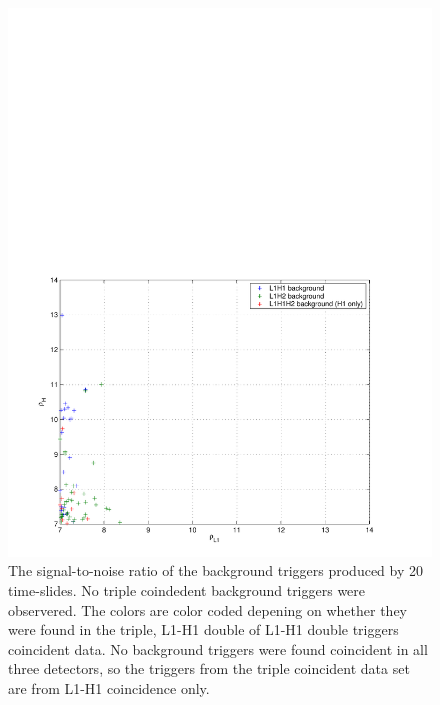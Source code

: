 \begin{figure}[p]
\begin{center}
\includegraphics[width=\textwidth]{figures/result/bkg}
\end{center}
\caption[Background Triggers from 20 Time Slides]{%
\label{f:bkg}%
The signal-to-noise ratio of the background triggers produced by 20
time-slides. No triple coindedent background triggers were observered.
The colors are color coded depening on whether they were found in the triple,
L1-H1 double of L1-H1 double triggers coincident data. No background triggers 
were found coincident in all three detectors, so the triggers from the triple
coincident data set are from L1-H1 coincidence only.
}
\end{figure}

